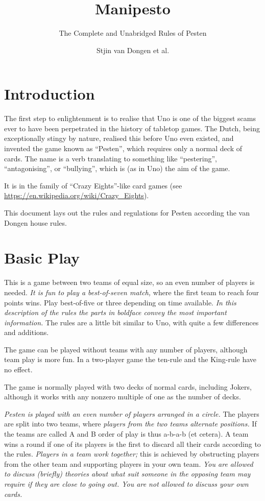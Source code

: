 \documentclass[a4paper,11pt]{scrartcl}
\author{Stjin van Dongen et al.}
\title{Manipesto}
\subtitle{The Complete and Unabridged Rules of Pesten}
\begin{document}
 \maketitle\thispagestyle{empty} %

 \section{Introduction}

 The first step to enlightenment is to realise that Uno is one of the biggest
 scams ever to have been perpetrated in the history of tabletop games. The
 Dutch, being exceptionally stingy by nature, realised this before Uno even
 existed, and invented the game known as ``Pesten'', which requires only a
 normal deck of cards. The name is a verb translating to something like
 ``pestering'', ``antagonising'', or ``bullying'', which is (as in Uno) the aim
 of the game.

 It is in the family of ``Crazy Eights''-like card games
 (see \url{https://en.wikipedia.org/wiki/Crazy_Eights}).

 This document lays out the rules and regulations for Pesten according the van
 Dongen house rules.

 \section{Basic Play}

 This is a game between two teams of equal size, so an even number of players is
 needed. \emph{It is fun to play a best-of-seven match,} where the first team to
 reach four points wins. Play best-of-five or three depending on time available.
 \emph{In this description of the rules the parts in boldface convey the most
 important information.} The rules are a little bit similar to Uno, with quite a
 few differences and additions.

 The game can be played without teams with any number of players, although team
 play is more fun. In a two-player game the ten-rule and the King-rule have no
 effect.

 The game is normally played with two decks of normal cards, including Jokers,
 although it works with any nonzero multiple of one as the number of decks.

 \emph{Pesten is played with an even number of players arranged in a circle.}
 The players are split into two teams, where \emph{players from the two teams
 alternate positions.} If the teams are called A and B order of play is thus
 a-b-a-b (et cetera). A team wins a round if one of its players is the first to
 discard all their cards according to the rules. \emph{Players in a team work
 together;} this is achieved by obstructing players from the other team and
 supporting players in your own team. \emph{You are allowed to discuss (briefly)
 theories about what suit someone in the opposing team may require if they are
 close to going out. You are not allowed to discuss your own cards.}
\end{document}
